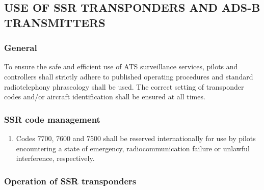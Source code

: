 \subsection[Use of SSR transponders and ADS-B transmitters]{USE OF SSR TRANSPONDERS AND ADS-B TRANSMITTERS}

\subsubsection{General}

To ensure the safe and efficient use of ATS surveillance services, pilots and controllers shall strictly adhere to published operating procedures and standard radiotelephony phraseology shall be used. The correct setting of transponder codes and/or aircraft identification shall be ensured at all times.

\subsubsection{SSR code management}

\begin{enumerate}
    \item Codes 7700, 7600 and 7500 shall be reserved internationally for use by pilots encountering a state of emergency, radiocommunication failure or unlawful interference, respectively.

\end{enumerate}

\subsubsection{Operation of SSR transponders}

\begin{enumempty}[labelindent=\parindent]
    \item {}
\end{enumempty}

